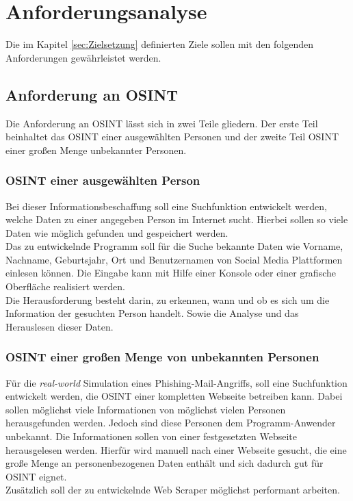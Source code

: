 
\chapter{Anforderungsanalyse}  %
\label{cha:Anforderungsanalyse und Prioriesierung} %
Die im Kapitel \ref{sec:Zielsetzung} definierten Ziele sollen mit den folgenden Anforderungen gewährleistet werden.

\section{Anforderung an OSINT}
Die Anforderung an OSINT lässt sich in zwei Teile gliedern. Der erste Teil beinhaltet das OSINT einer ausgewählten Personen und der zweite Teil OSINT einer großen Menge unbekannter Personen.
	
	\subsection{OSINT einer ausgewählten Person}
	Bei dieser Informationsbeschaffung soll eine Suchfunktion entwickelt werden, welche Daten zu einer angegeben Person im Internet sucht. Hierbei sollen so viele Daten wie möglich gefunden und gespeichert werden.\\
	Das zu entwickelnde Programm soll für die Suche bekannte Daten wie Vorname, Nachname, Geburtsjahr, Ort und Benutzernamen von Social Media Plattformen einlesen können. Die Eingabe kann mit Hilfe einer Konsole oder einer grafische Oberfläche realisiert werden.\\
	Die Herausforderung besteht darin, zu erkennen, wann und ob es sich um die Information der gesuchten Person handelt. Sowie die Analyse und das Herauslesen dieser Daten.
	
	\subsection{OSINT einer großen Menge von unbekannten Personen}
	Für die \textit{real-world} Simulation eines Phishing-Mail-Angriffs, soll eine Suchfunktion entwickelt werden, die OSINT einer kompletten Webseite betreiben kann. Dabei sollen möglichst viele Informationen von möglichst vielen Personen herausgefunden werden. Jedoch sind diese Personen dem Programm-Anwender unbekannt. Die Informationen sollen von einer festgesetzten Webseite herausgelesen werden. Hierfür wird manuell nach einer Webseite gesucht, die eine große Menge an personenbezogenen Daten enthält und sich dadurch gut für OSINT eignet.\\
	Zusätzlich soll der zu entwickelnde Web Scraper möglichst performant arbeiten.
		
